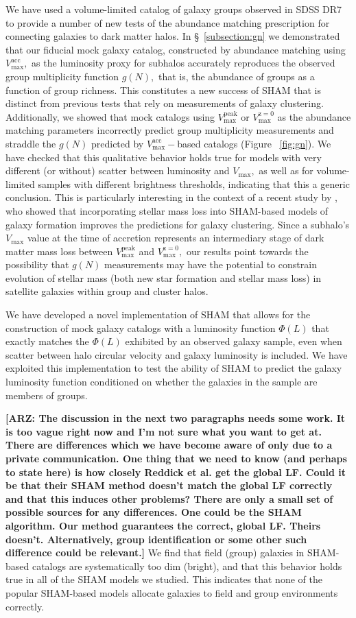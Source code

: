\documentclass[usenatbib,usegraphicx,letterpaper]{mn2e}
\newcommand{\vpeak}{V_{\mathrm{max}}^{\mathrm{peak}}}
\newcommand{\vmax}{V_{\mathrm{max}}}
\newcommand{\vacc}{V_{\mathrm{max}}^{\mathrm{acc}}}
\newcommand{\vzero}{V_{\mathrm{max}}^{\mathrm{z=0}}}
\begin{document}
We have used a volume-limited catalog of galaxy groups observed in
SDSS DR7 to provide a number of new tests of the abundance matching
prescription for connecting galaxies to dark matter halos. In
\S~\ref{subsection:gn} we demonstrated that our fiducial mock galaxy
catalog, constructed by abundance matching using $\vacc,$ as the luminosity proxy for subhalos 
accurately reproduces the observed group multiplicity function $g(N),$ that is,
the abundance of groups as a function of group richness. This
constitutes a new success of SHAM that is distinct from previous tests
that rely on measurements of galaxy clustering. Additionally, we
showed that mock catalogs using $\vpeak$ or $\vzero$ as the abundance
matching parameters incorrectly predict group multiplicity
measurements and straddle the $g(N)$ predicted by $\vacc-$based
catalogs (Figure ~\ref{fig:gn}). We have checked that this qualitative
behavior holds true for models with very different (or without)
scatter between luminosity and $\vmax,$ as well as for volume-limited
samples with different brightness thresholds, 
indicating that this a generic conclusion. This is
particularly interesting in the context of a recent study by
\citet{watson_etal11}, who showed that incorporating stellar mass loss
into SHAM-based models of galaxy formation improves the predictions
for galaxy clustering. Since a subhalo's $\vmax$ value at the time of
accretion represents an intermediary stage of dark matter mass loss
between $\vpeak$ and $\vzero,$ our results point towards the
possibility that $g(N)$ measurements may have the potential to
constrain evolution of stellar mass (both new star formation and 
stellar  mass loss) in satellite galaxies within group and cluster halos.

We have developed a novel implementation of SHAM that allows for the
construction of mock galaxy catalogs with a luminosity function
$\Phi(L)$ that exactly matches the $\Phi(L)$ exhibited by an 
observed galaxy sample, even when scatter between halo circular velocity 
and galaxy luminosity is included. We have
exploited this implementation to test the ability of SHAM to predict
the galaxy luminosity function conditioned on whether the galaxies in
the sample are members of groups. 

{\bf [ARZ: The discussion in the next two paragraphs 
needs some work.  It is too vague right now 
and I'm not sure what you want to get at.  There are differences 
which we have become aware of only due to a private communication.  
One thing that we need to know (and perhaps to state here) is how 
closely Reddick et al. get the global LF.  Could it be that 
their SHAM method doesn't match the global LF correctly and that 
this induces other problems?  There are only a small set of possible 
sources for any differences.  One could be the SHAM algorithm.  Our 
method guarantees the correct, global LF.  Theirs doesn't.  Alternatively, 
group identification or some other such difference could be relevant.]}
We find that field (group) galaxies in SHAM-based catalogs are systematically 
too dim (bright), and that this behavior holds true in all of the 
SHAM models we studied. This indicates that none of the popular 
SHAM-based models allocate galaxies to field and group environments 
correctly. 
\end{document}
